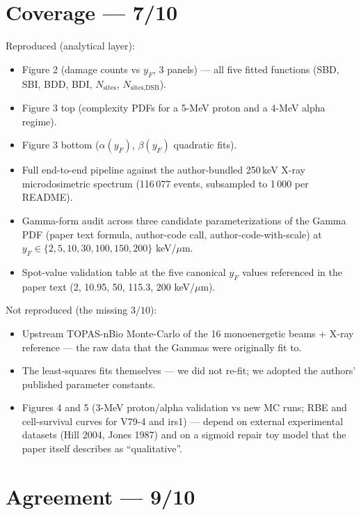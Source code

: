 \documentclass[11pt]{article}
\begin{document}
\section{Coverage --- 7/10}

Reproduced (analytical layer):
\begin{itemize}
\item Figure 2 (damage counts vs $y_F$, 3 panels) --- all five fitted functions
  (SBD, SBI, BDD, BDI, $N_{\text{sites}}$, $N_{\text{sites,DSB}}$).
\item Figure 3 top (complexity PDFs for a 5-MeV proton and a 4-MeV alpha regime).
\item Figure 3 bottom ($\alpha(y_F)$, $\beta(y_F)$ quadratic fits).
\item Full end-to-end pipeline against the author-bundled 250\,keV X-ray
  microdosimetric spectrum (116\,077 events, subsampled to 1\,000 per README).
\item Gamma-form audit across three candidate parameterizations of the Gamma
  PDF (paper text formula, author-code call, author-code-with-scale)
  at $y_F \in \{2, 5, 10, 30, 100, 150, 200\}$ keV/$\mu$m.
\item Spot-value validation table at the five canonical $y_F$ values referenced
  in the paper text (2, 10.95, 50, 115.3, 200 keV/$\mu$m).
\end{itemize}

Not reproduced (the missing $3/10$):
\begin{itemize}
\item Upstream TOPAS-nBio Monte-Carlo of the 16 monoenergetic beams + X-ray
  reference --- the raw data that the Gammas were originally fit to.
\item The least-squares fits themselves --- we did not re-fit; we adopted the
  authors' published parameter constants.
\item Figures 4 and 5 (3-MeV proton/alpha validation vs new MC runs; RBE and
  cell-survival curves for V79-4 and irs1) --- depend on external experimental
  datasets (Hill 2004, Jones 1987) and on a sigmoid repair toy model that the
  paper itself describes as ``qualitative''.
\end{itemize}

\section{Agreement --- 9/10}
\end{document}

